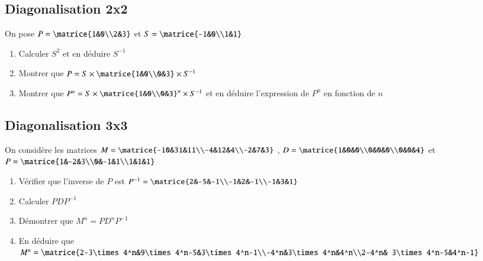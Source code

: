 \documentclass[oneside,12pt]{article}          %
\begin{document}
\subsection{Diagonalisation 2x2}
On pose $P=\matrice{1&0\\2&3} $ et $S=\matrice{-1&0\\1&1} $
\begin{enumerate}
    \item Calculer $S^2$ et en déduire $S^{-1}$
    \item Montrer que $P=S\times\matrice{1&0\\0&3}\times S^{-1}$
    \item Montrer que $P^n=S\times\matrice{1&0\\0&3}^n\times S^{-1}$ et en déduire l'expression de $P^n$ en fonction de $n$
\end{enumerate}



\subsection{Diagonalisation 3x3}
On considère les matrices $M=\matrice{-10&31&11\\-4&12&4\\-2&7&3} $ , $D=\matrice{1&0&0\\0&0&0\\0&0&4} $ et $P=\matrice{1&-2&3\\0&-1&1\\1&1&1} $
\begin{enumerate}
    \item Vérifier que l'inverse de $P$ est $P^{-1}=\matrice{2&-5&-1\\-1&2&-1\\-1&3&1} $
    \item Calculer $PDP^{-1}$
    \item Démontrer que $M^n=PD^nP^{-1}$
    \item En déduire que $M^n=\matrice{2-3\times4^n&9\times4^n-5&3\times4^n-1\\-4^n&3\times4^n&4^n\\2-4^n&  3\times4^n-5&4^n-1} $
\end{enumerate}
\end{document}

